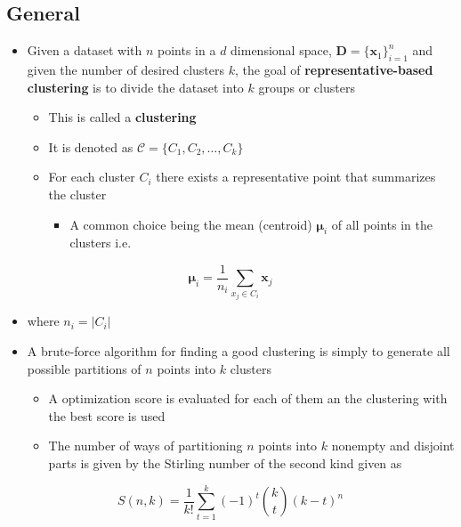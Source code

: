 \documentclass[11pt]{article}
\begin{document}
\subsection{General}
\label{sec:org94c8de6}
\begin{itemize}
\item Given a dataset with \(n\) points in a \(d\) dimensional space, \(\mathbf D = \{ \pmb x_1 \}_{i=1}^n\) and given the number of desired clusters \(k\), the goal of \textbf{representative-based clustering} is to divide the dataset into \(k\) groups or clusters
\begin{itemize}
\item This is called a \textbf{clustering}
\item It is denoted as \(\mathcal C = \{C_1, C_2, \dots, C_k\}\)
\item For each cluster \(C_i\) there exists a representative point that summarizes the cluster
\begin{itemize}
\item A common choice being the mean (centroid) \(\pmb \mu_i\) of all points in the clusters i.e.
\end{itemize}
\end{itemize}
\end{itemize}
\begin{equation}
  \pmb \mu_i = \frac1{n_i} \sum _{x_j \in C_i} \pmb x_j
\end{equation}
\begin{itemize}
\item where \(n_i = |C_i|\)

\item A brute-force algorithm for finding a good clustering is simply to generate all possible partitions of \(n\) points into \(k\) clusters
\begin{itemize}
\item A optimization score is evaluated for each of them an the clustering with the best score is used
\item The number of ways of partitioning \(n\) points into \(k\) nonempty and disjoint parts is given by the Stirling number of the second kind given as
\end{itemize}
\end{itemize}
\begin{equation}
    S(n,k) = \frac1{k!} \sum_{t=1}^k (-1)^t \binom{k}{t} (k-t)^n
\end{equation}
\end{document}
